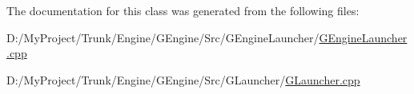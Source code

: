 The documentation for this class was generated from the following files\+:\begin{DoxyCompactItemize}
\item 
D\+:/\+My\+Project/\+Trunk/\+Engine/\+G\+Engine/\+Src/\+G\+Engine\+Launcher/\hyperlink{_g_engine_launcher_8cpp}{G\+Engine\+Launcher.\+cpp}\item 
D\+:/\+My\+Project/\+Trunk/\+Engine/\+G\+Engine/\+Src/\+G\+Launcher/\hyperlink{_g_launcher_8cpp}{G\+Launcher.\+cpp}\end{DoxyCompactItemize}

